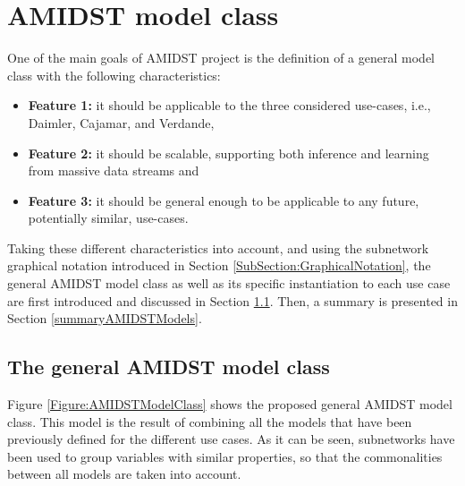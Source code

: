 \section{AMIDST model class}\label{section:AMIDSTmodelClass}

One of the main goals of AMIDST project is the definition of a general model class with the following characteristics: 

\begin{itemize}
\item \textbf{Feature 1:} it should be applicable to the three considered use-cases, i.e., Daimler, Cajamar, and Verdande,

\item \textbf{Feature 2:} it should be scalable, supporting both inference and learning from massive data streams and

\item \textbf{Feature 3:}  it should be general enough to be applicable to any future, potentially similar, use-cases.

\end{itemize}

Taking these different characteristics into account, and using the subnetwork graphical notation introduced in Section \ref{SubSection:GraphicalNotation}, the general AMIDST model class as well as its specific instantiation to each use case are first introduced and discussed in Section \ref{GeneralModelClass}. Then, a summary is presented in Section \ref{summaryAMIDSTModels}.

\subsection{The general AMIDST model class}\label{GeneralModelClass}

Figure \ref{Figure:AMIDSTModelClass} shows the proposed general AMIDST model class. This model is the result of combining all the models that have been previously defined for the different use cases. As it can be seen, subnetworks have been used to group variables with similar properties, so that the commonalities between all models are taken into account. 

